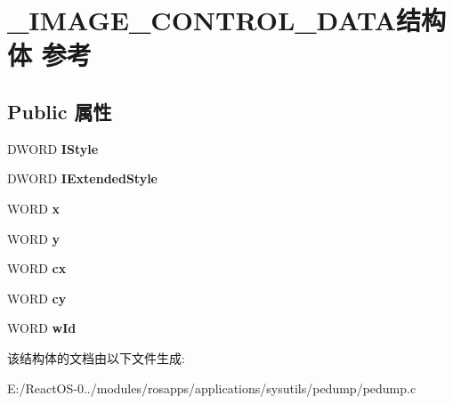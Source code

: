 \hypertarget{struct___i_m_a_g_e___c_o_n_t_r_o_l___d_a_t_a}{}\section{\+\_\+\+I\+M\+A\+G\+E\+\_\+\+C\+O\+N\+T\+R\+O\+L\+\_\+\+D\+A\+T\+A结构体 参考}
\label{struct___i_m_a_g_e___c_o_n_t_r_o_l___d_a_t_a}
\subsection*{Public 属性}
\begin{DoxyCompactItemize}
\item 
\mbox{\label{struct___i_m_a_g_e___c_o_n_t_r_o_l___d_a_t_a_a341be3def9de403f5d35143a25f9be5c}} 
D\+W\+O\+RD {\bfseries I\+Style}
\item 
\mbox{\label{struct___i_m_a_g_e___c_o_n_t_r_o_l___d_a_t_a_a443a313a18eea315ddba3ac447ef2907}} 
D\+W\+O\+RD {\bfseries I\+Extended\+Style}
\item 
\mbox{\label{struct___i_m_a_g_e___c_o_n_t_r_o_l___d_a_t_a_ae0dc01db8cc36ec5571a7fb4b41fc83c}} 
W\+O\+RD {\bfseries x}
\item 
\mbox{\label{struct___i_m_a_g_e___c_o_n_t_r_o_l___d_a_t_a_a203dc6804acd3f9b05cb3835c69752a5}} 
W\+O\+RD {\bfseries y}
\item 
\mbox{\label{struct___i_m_a_g_e___c_o_n_t_r_o_l___d_a_t_a_a6bb6997d9703e0ed0fe267265ae1eb64}} 
W\+O\+RD {\bfseries cx}
\item 
\mbox{\label{struct___i_m_a_g_e___c_o_n_t_r_o_l___d_a_t_a_a90762a5a88ed329ca17f17e9986a14e5}} 
W\+O\+RD {\bfseries cy}
\item 
\mbox{\label{struct___i_m_a_g_e___c_o_n_t_r_o_l___d_a_t_a_a6b146f55491c0173262b3d08423300bf}} 
W\+O\+RD {\bfseries w\+Id}
\end{DoxyCompactItemize}


该结构体的文档由以下文件生成\+:\begin{DoxyCompactItemize}
\item 
E\+:/\+React\+O\+S-\/0../modules/rosapps/applications/sysutils/pedump/pedump.\+c\end{DoxyCompactItemize}
